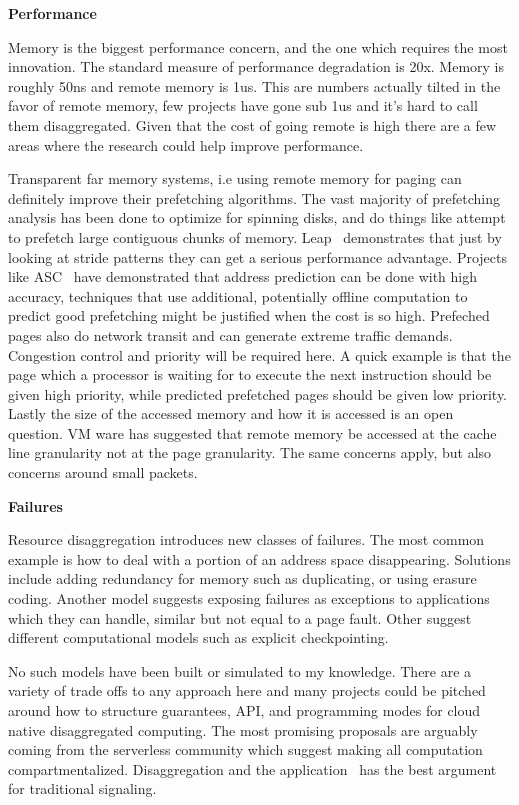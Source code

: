 \textbf{Performance}

Memory is the biggest performance concern, and the one which requires the most
innovation. The standard measure of performance degradation is 20x. Memory is
roughly 50ns and remote memory is 1us. This are numbers actually tilted in the
favor of remote memory, few projects have gone sub 1us and it's hard to call
them disaggregated. Given that the cost of going remote is high there are a few
areas where the research could help improve performance.

Transparent far memory systems, i.e using remote memory for paging can definitely
improve their prefetching algorithms. The vast majority of prefetching analysis
has been done to optimize for spinning disks, and do things like attempt to
prefetch large contiguous chunks of memory. Leap~\cite{leap} demonstrates that
just by looking at stride patterns they can get a serious performance advantage.
Projects like ASC~\cite{asc} have demonstrated that address prediction can be
done with high accuracy, techniques that use additional, potentially offline
computation to predict good prefetching might be justified when the cost is so
high. Prefeched pages also do network transit and can generate extreme traffic
demands. Congestion control and priority will be required here. A quick example
is that the page which a processor is waiting for to execute the next
instruction should be given high priority, while predicted prefetched pages
should be given low priority. Lastly the size of the accessed memory and how it
is accessed is an open question. VM ware has suggested that remote memory be
accessed at the cache line granularity not at the page granularity. The same
concerns apply, but also concerns around small packets.



\textbf{Failures}

Resource disaggregation introduces new classes of failures. The most common
example is how to deal with a portion of an address space disappearing.
Solutions include adding redundancy for memory such as duplicating, or using
erasure coding. Another model suggests exposing failures as exceptions to
applications which they can handle, similar but not equal to a page fault. Other
suggest different computational models such as explicit checkpointing. 

No such models have been built or simulated to my knowledge. There are a variety
of trade offs to any approach here and many projects could be pitched around how
to structure guarantees, API, and programming modes for cloud native
disaggregated computing. The most promising proposals are arguably coming from
the serverless community which suggest making all computation compartmentalized.
Disaggregation and the application~\cite{ddcaps} has the best argument for
traditional signaling.

